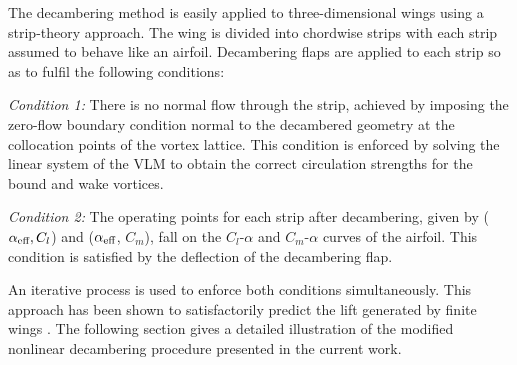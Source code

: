 The decambering method is easily applied to three-dimensional wings using a strip-theory approach. The wing is divided into chordwise strips with each strip assumed to behave like an airfoil. Decambering flaps are applied to each strip so as to fulfil the following conditions:

\label{sec:decambering-conditions}
\emph{Condition 1:} There is no normal flow through the strip, achieved by imposing the zero-flow boundary condition  normal to the decambered geometry at the collocation points of the vortex lattice. This condition is enforced by solving the linear system of the VLM to obtain the correct circulation strengths for the bound and wake vortices.

\emph{Condition 2:} The operating points for each strip after decambering, given by ($\alpha_\text{eff}{}, C_l$) and ($\alpha_\text{eff}{}$, $C_m$), fall on the $C_l$-$\alpha$ and $C_m$-$\alpha$ curves of the airfoil. This condition is satisfied by the deflection of the decambering flap.

An iterative process is used to enforce both conditions simultaneously. This approach has been shown to satisfactorily predict the lift generated by finite wings \cite{Mukherjee_poststall_2006,Paul_Gopa_Iteration_Schemes,gopalarathnam_paul_petrilli_ASM_2012}. The following section gives a detailed illustration of the modified nonlinear decambering procedure presented in the current work.
